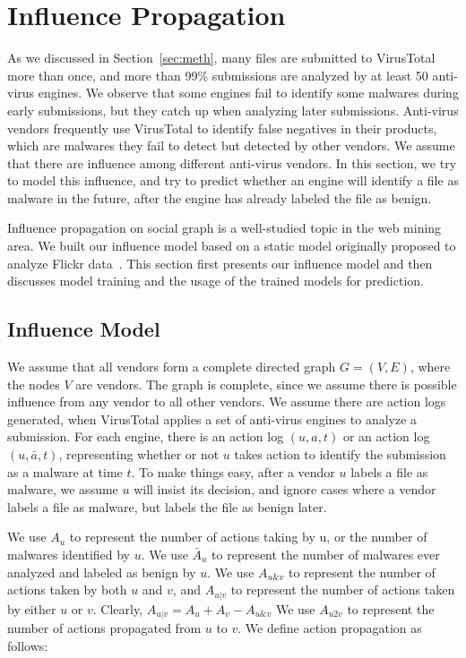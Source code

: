 \section{Influence Propagation}
\label{sec:influ}

As we discussed in Section~\ref{sec:meth}, 
many files are submitted to VirusTotal more than once, 
and more than 99\% submissions are analyzed by at least 50 anti-virus engines. 
We observe that some engines fail to identify some malwares during early submissions, 
but they catch up when analyzing later submissions. 
Anti-virus vendors frequently use VirusTotal to identify false negatives in their products, 
which are malwares they fail to detect but detected by other vendors. 
We assume that there are influence among different anti-virus vendors.
In this section, we try to model this influence,
and try to predict whether an engine will identify a file as malware in the future, 
after the engine has already labeled the file as benign.

Influence propagation on social graph is a well-studied topic in the web mining area. 
We built our influence model based on a static model originally proposed to analyze Flickr data~\cite{Influence}.
This section first presents our influence model
and then discusses model training and the usage of the trained models for prediction.

\subsection{Influence Model}
\label{sec:model}


We assume that all vendors form a complete directed graph $G = (V, E)$, 
where the nodes $V$ are vendors. 
The graph is complete, 
since we assume there is possible influence from any vendor to all other vendors.
We assume there are action logs generated, 
when VirusTotal applies a set of anti-virus engines to analyze a submission. 
For each engine, there is an action log $(u, a, t)$ or an action log $(u, \bar{a}, t)$, 
representing whether or not $u$ takes action to identify the submission as a malware at time $t$. 
To make things easy, after a vendor $u$ labels a file as malware, 
we assume $u$ will insist its decision, 
and ignore cases where a vendor labels a file as malware, but labels the file as benign later. 

We use $A_u$ to represent the number of actions taking by u, 
or the number of malwares identified by $u$. 
We use $\bar{A}_u$ to represent the number of malwares ever analyzed and labeled as benign by $u$.
We use $A_{u\&v}$ to represent the number of actions taken by both $u$ and $v$, 
and $A_{u|v}$ to represent the number of actions taken by either $u$ or $v$.
Clearly, $A_{u|v} =   A_u + A_v - A_{u\&v}$
We use $A_{u2v}$ to represent the number of actions propagated from $u$ to $v$. 
We define action propagation as follows: 

